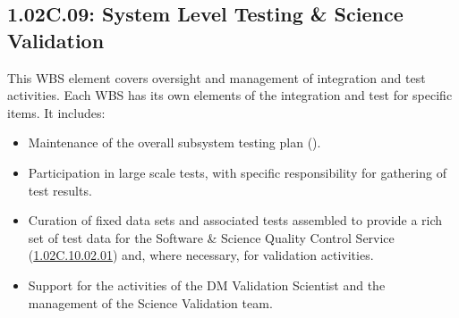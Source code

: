 \subsection*{1.02C.09: System Level Testing \& Science Validation}

This WBS element covers oversight and management of integration and test activities. Each WBS has its own elements of the integration and test for specific items. It includes:

\begin{itemize}

\item{Maintenance of the overall subsystem testing plan ().}

\item{Participation in large scale tests, with specific responsibility for
gathering of test results.}

\item{Curation of fixed data sets and associated tests assembled to provide a
rich set of test data for the Software \& Science Quality Control Service
(\hyperref[wbs:1.02C.10.02.01]{1.02C.10.02.01}) and, where necessary, for
validation activities.}

\item{Support for the activities of the DM Validation Scientist and the
management of the Science Validation team.}

\end{itemize}


